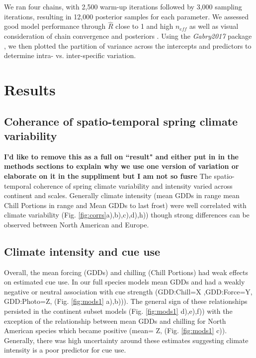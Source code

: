\documentclass[12pt]{article}\usepackage[]{graphicx}\usepackage[]{color}
\begin{document}
We ran four chains, with 2,500 warm-up iterations followed by 3,000 sampling iterations, resulting in 12,000 posterior samples for each parameter. We assessed good model performance through $\hat{R}$ close to 1 and high $n_{eff}$ as well as visual consideration of chain convergence and posteriors \citep{Gelman2006}. Using the \textit{Gabry2017} package \citep{bayesplot}, we then plotted the partition of variance across the intercepts and predictors to determine intra- vs. inter-specific variation.  



\section*{Results}

\subsection*{Coherance of spatio-temporal spring climate variability}
\textbf{I'd like to remove this as a full on ``result" and either put in in the methods sections to explain why we use one version of variation or elaborate on it in the suppliment but I am not so fusre}
The spatio-temporal coherence of spring climate variability and intensity varied across continent and scales. Generally climate intensity (mean GDDs in range mean Chill Portions in range and Mean GDDs to last frost) were well correlated with climate variability (Fig. \ref{fig:corrs}a),b),c),d),h)) though strong differences can be observed between North American and Europe.  %

\subsection*{Climate intensity and cue use}
Overall, the mean forcing (GDDs) and chilling (Chill Portions) had weak effects on estimated cue use. 
In our full species models mean GDDs and had a weakly negative or neutral association with cue strength (GDD:Chill=X ,GDD:Force=Y, GDD:Photo=Z, (Fig. \ref{fig:mods1} a),b))). The general sign of these relationships persisted in the continent subset models (Fig. \ref{fig:mods1} d),e),f)) with the exception of the relationship between mean GDDs and chilling for North American species which became positive (mean= Z, (Fig. \ref{fig:mods1} c)). Generally, there was high uncertainty around these estimates suggesting climate intensity is a poor predictor for cue use. 
\end{document}
